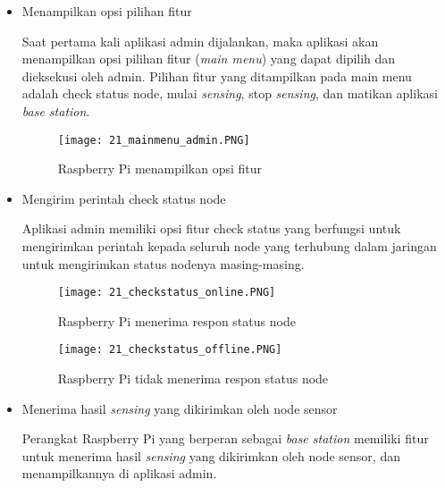     \begin{itemize}
        \item Menampilkan opsi pilihan fitur
        
        Saat pertama kali aplikasi admin dijalankan, maka aplikasi akan menampilkan opsi pilihan fitur (\textit{main menu}) yang dapat dipilih dan dieksekusi oleh admin. Pilihan fitur yang ditampilkan pada main menu adalah check status node, mulai \textit{sensing}, stop \textit{sensing}, dan matikan aplikasi \textit{base station}.
        
        \begin{figure}[H]
        	\centering  
        	\texttt{[image: 21\_mainmenu\_admin.PNG]}  
        	\caption[Raspberry Pi  menampilkan opsi fitur]{Raspberry Pi  menampilkan opsi fitur} 
        	\label{fig:Raspberry Pi menampilkan opsi fitur} 
        \end{figure}
    
        \item Mengirim perintah check status node
        
        Aplikasi admin memiliki opsi fitur check status yang berfungsi untuk mengirimkan perintah kepada seluruh node yang terhubung dalam jaringan untuk mengirimkan status nodenya masing-masing.
        
        \begin{figure}[H]
        	\centering  
        	\texttt{[image: 21\_checkstatus\_online.PNG]}  
        	\caption[Raspberry Pi menerima respon status node]{Raspberry Pi menerima respon status node} 
        	\label{fig:Raspberry Pi menerima respon status node} 
        \end{figure}
        
        \begin{figure}[H]
        	\centering  
        	\texttt{[image: 21\_checkstatus\_offline.PNG]}  
        	\caption[Raspberry Pi tidak menerima respon status node]{Raspberry Pi tidak menerima respon status node} 
        	\label{fig:Raspberry Pi tidak menerima respon status node} 
        \end{figure}
    
        \item Menerima hasil \textit{sensing} yang dikirimkan oleh node sensor
        
        Perangkat Raspberry Pi yang berperan sebagai \textit{base station} memiliki fitur untuk menerima hasil \textit{sensing} yang dikirimkan oleh node sensor, dan menampilkannya di aplikasi admin.
        

\end{itemize}
